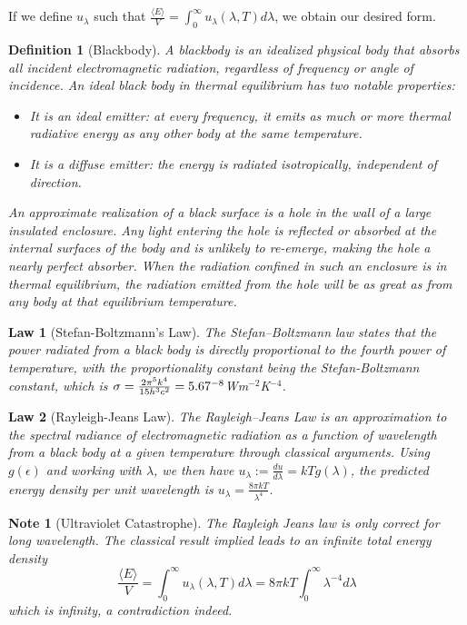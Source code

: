 \documentclass[a4paper]{article}
\newtheorem{defi}{Definition}[section]
\newtheorem{note}{Note}[section]
\newtheorem{law}{Law}[section]
\theoremstyle{new}
\begin{document}
If we define $u_\lambda$ such that $\frac{\langle E\rangle}{V}=\int_0^\infty u_\lambda(\lambda,T)d\lambda$, we obtain our desired form.
\begin{defi}[Blackbody]
A blackbody is an idealized physical body that absorbs all incident electromagnetic radiation, regardless of frequency or angle of incidence. An ideal black body in thermal equilibrium has two notable properties:
\begin{itemize}
    \item It is an ideal emitter: at every frequency, it emits as much or more thermal radiative energy as any other body at the same temperature.
    \item It is a diffuse emitter: the energy is radiated isotropically, independent of direction.
\end{itemize}
An approximate realization of a black surface is a hole in the wall of a large insulated enclosure. Any light entering the hole is reflected or absorbed at the internal surfaces of the body and is unlikely to re-emerge, making the hole a nearly perfect absorber. When the radiation confined in such an enclosure is in thermal equilibrium, the radiation emitted from the hole will be as great as from any body at that equilibrium temperature.
\end{defi}
\begin{law}[Stefan-Boltzmann's Law]
The Stefan–Boltzmann law states that the power radiated from a black body is directly proportional to the fourth power of temperature, with the proportionality constant being the Stefan-Boltzmann constant, which is $\sigma=\frac{2\pi^5k^4}{15h^3c^2}=5.67\time10^{-8}$Wm$^{-2}$K$^{-4}$. 
\end{law}
\begin{law}[Rayleigh-Jeans Law]
The Rayleigh–Jeans Law is an approximation to the spectral radiance of electromagnetic radiation as a function of wavelength from a black body at a given temperature through classical arguments. Using $g(\epsilon)$ and working with $\lambda$, we then have $u_\lambda:=\frac{du}{d\lambda}=kTg(\lambda)$, the predicted energy density per unit wavelength is $u_\lambda=\frac{8\pi kT}{\lambda^4}$.
\end{law}
\begin{note}[Ultraviolet Catastrophe]
The Rayleigh Jeans law is only correct for long wavelength. The classical result implied leads to an infinite total energy density
$$\frac{\langle E\rangle}{V}=\int_0^\infty u_\lambda(\lambda,T)d\lambda=8\pi kT\int_0^\infty\lambda^{-4}d\lambda$$
which is infinity, a contradiction indeed.
\end{note}
\end{document}
